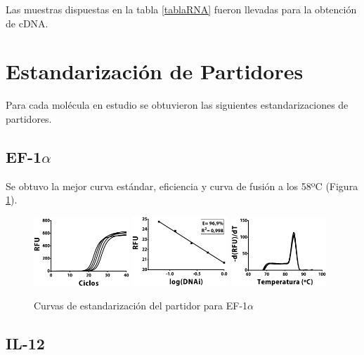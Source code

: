 \documentclass[12pt,letterpaper,oneside]{scrbook}
\begin{document}
Las muestras dispuestas en la tabla \ref{tablaRNA} fueron llevadas para
la obtención de cDNA. \section{Estandarización de Partidores}

Para cada molécula en estudio se obtuvieron las siguientes
estandarizaciones de partidores.

\subsection{EF-1$\alpha$}

Se obtuvo la mejor curva estándar, eficiencia y curva de fusión a los
58ºC (Figura \ref{fig:ef1a}).

\begin{figure}[h]
    \centering
        {\includegraphics[width=0.32\textwidth]{standarization/ef1a/ampl}}
        {\includegraphics[width=0.32\textwidth]{standarization/ef1a/stand}}
        {\includegraphics[width=0.32\textwidth]{standarization/ef1a/melting}}
        \caption{Curvas de estandarización del partidor para EF-1$\alpha$}
    \label {fig:ef1a}
\end{figure}

\subsection{IL-12}
\end{document}

